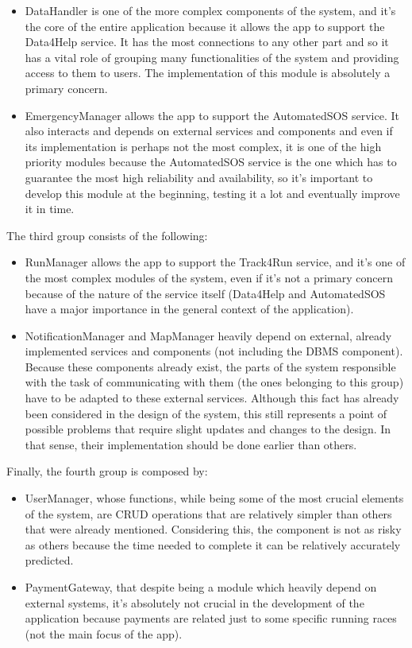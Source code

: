 \begin{itemize}
\item DataHandler is one of the more complex components of the system, and it's the core of the entire application because it allows the app to support the Data4Help service. It has the most connections to any other part and so it has a vital role of grouping many functionalities of the system and providing
access to them to users. The implementation of this module is absolutely a primary concern.
\item EmergencyManager allows the app to support the AutomatedSOS service. It also interacts and depends on external services and components and even if its implementation is perhaps not the most complex, it is one of the high priority modules because the AutomatedSOS service is the one which has to guarantee the most high reliability and availability, so it's important to develop this module at the beginning, testing it a lot and eventually improve it in time.
\end{itemize}

The third group consists of the following:
\begin{itemize}
\item RunManager allows the app to support the Track4Run service, and it's one of the most complex modules of the system, even if it's not a primary concern because of the nature of the service itself (Data4Help and AutomatedSOS have a major importance in the general context of the application).
\item NotificationManager and MapManager heavily depend on external, already implemented services and components (not including the DBMS component). Because these components already exist, the parts of the system responsible with the task of communicating with them (the ones belonging to this group) have to be adapted to these external services. Although this fact has already been considered in the design of the system, this still represents a point of possible problems that require slight updates and changes to the
design. In that sense, their implementation should be done earlier than others.
\end{itemize}

Finally, the fourth group is composed by:
\begin{itemize}
\item UserManager, whose functions, while being some of the most crucial elements of the system, are CRUD operations that are relatively simpler than others that were already mentioned. Considering this, the component is not as risky as others because the time needed to complete it can be relatively accurately predicted.
\item PaymentGateway, that despite being a module which heavily depend on external systems, it's absolutely not crucial in the development of the application because payments are related just to some specific running races (not the main focus of the app).
\end{itemize}

